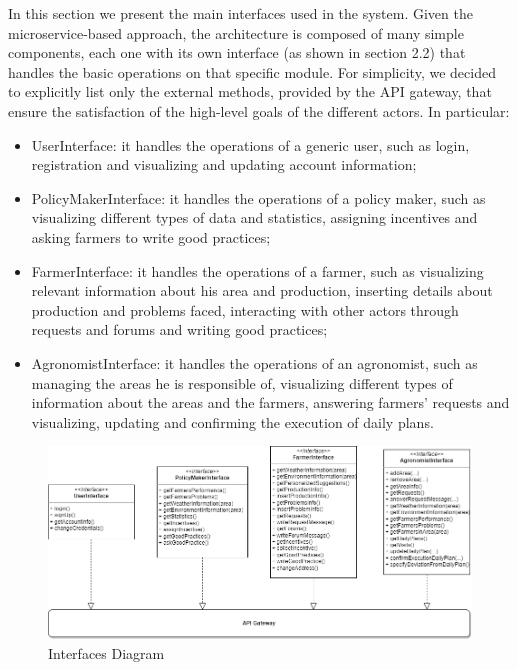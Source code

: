 
In this section we present the main interfaces used in the system. Given the microservice-based approach, the architecture is composed of many simple components, each one with its own interface (as shown in section 2.2) that handles the basic operations on that specific module. 
\newline
\newline
For simplicity, we decided to explicitly list only the external methods, provided by the API gateway, that ensure the satisfaction of the high-level goals of the different actors.
\newline
\newline
In particular:
\begin{itemize}
    \item UserInterface: it handles the operations of a generic user, such as login, registration and  visualizing and updating account information;
    \item PolicyMakerInterface: it handles the operations of a policy maker, such as visualizing different types of data and statistics, assigning incentives and asking farmers to write good practices;
    \item FarmerInterface: it handles the operations of a farmer, such as visualizing relevant information about his area and production, inserting details about production and problems faced, interacting with other actors through requests and forums and writing good practices; 
    \item AgronomistInterface: it handles the operations of an agronomist, such as managing the areas he is responsible of, visualizing different types of information about the areas and the farmers, answering farmers’ requests and visualizing, updating and confirming the execution of daily plans.
\end{itemize}

\begin{figure}[H]
	\centering
    \includegraphics[width=\textwidth]{Images/Architecture/Interface Diagram.png}
	\caption{\label{fig:interfaces_diagram}Interfaces Diagram}
\end{figure}